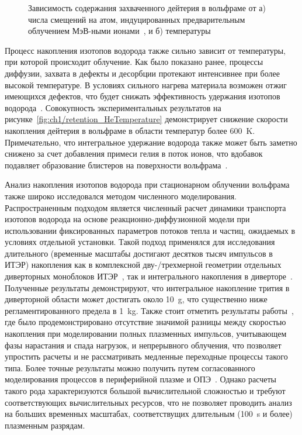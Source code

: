 \begin{figure}[ht]
    \caption{Зависимость содержания захваченного дейтерия в вольфраме от а) числа смещений на атом, индуцированных предварительным облучением МэВ-ными ионами~\cite{Roth2011}, и б) температуры~\cite{Rieth2019}}
\end{figure}

Процесс накопления изотопов водорода также сильно зависит от температуры, при которой происходит облучение. Как было показано ранее, процессы диффузии, захвата в дефекты и десорбции протекают интенсивнее при более высокой температуре. В условиях сильного нагрева материала возможен отжиг имеющихся дефектов, что будет снижать эффективность удержания изотопов водорода~\cite{Dark2024}. Совокупность экспериментальных результатов на рисунке~\cref{fig:ch1/retention_HeTemperature} демонстрирует снижение скорости накопления дейтерия в вольфраме в области температур более \SI{600}{\kelvin}. Примечательно, что интегральное удержание водорода также может быть заметно снижено за счет добавления примеси гелия в поток ионов, что вдобавок подавляет образование блистеров на поверхности вольфрама~\cite{Baldwin2011}. 

Анализ накопления изотопов водорода при стационарном облучении вольфрама также широко исследовался методом численного моделирования. Распространенным подходом является численный расчет динамики транспорта изотопов водорода на основе реакционно-диффузионной модели при использовании фиксированных параметров потоков тепла и частиц, ожидаемых в условиях отдельной установки. Такой подход применялся для исследования длительного (временные масштабы достигают десятков тысяч импульсов в ИТЭР) накопления как в комплексной дву-/трехмерной геометрии отдельных диверторных моноблоков ИТЭР~\cite{Delaporte-Mathurin2019,Hodille2021_2,Delaporte-Mathurin2021}, так и интегрального накопления в диверторе~\cite{Delaporte-Mathurin2020, Delaporte-Mathurin2021_2}. Полученные результаты демонстрируют, что интегральное накопление трития в диверторной области может достигать около \SI{10}{\gram}, что существенно ниже регламентированного предела в \SI{1}{\kilogram}. Также стоит отметить результаты работы~\cite{Hodille2021_2}, где было продемонстрировано отсутствие значимой разницы между скоростью накопления при моделировании полных плазменных импульсов, учитывающем фазы нарастания и спада нагрузок, и непрерывного облучения, что позволяет упростить расчеты и не рассматривать медленные переходные процессы такого типа. Более точные результаты можно получить путем согласованного моделирования процессов в периферийной плазме и ОПЭ~\cite{Smirnov2020,Lasa2024,Smirnov2024}. Однако расчеты такого рода характеризуются большой вычислительной сложностью и требуют соответствующих вычислительных ресурсов, что не позволяет проводить анализ на больших временных масштабах, соответствущих длительным (\SI{100}{\second} и более) плазменным разрядам.


